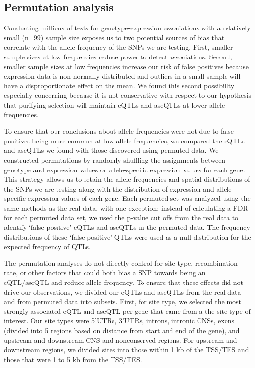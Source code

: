 \subsection{Permutation analysis}
Conducting millions of tests for genotype-expression associations with a relatively small (n=99) sample size exposes us to two potential sources of bias that correlate with the allele frequency of the SNPs we are testing. First, smaller sample sizes at low frequencies reduce power to detect associations. Second, smaller sample sizes at low frequencies increase our risk of false positives because expression data is non-normally distributed and outliers in a small sample will have a disproportionate effect on the mean. We found this second possibility especially concerning because it is not conservative with respect to our hypothesis that purifying selection will maintain eQTLs and aseQTLs at lower allele frequencies. 

To ensure that our conclusions about allele frequencies were not due to false positives being more common at low allele frequencies, we compared the eQTLs and aseQTLs we found with those discovered using permuted data. We constructed permutations by randomly shuffling the assignments between genotype and expression values or allele-specific expression values for each gene. This strategy allows us to retain the allele frequencies and spatial distributions of the SNPs we are testing along with the distribution of expression and allele-specific expression values of each gene. Each permuted set was analyzed using the same methods as the real data, with one exception: instead of calculating a FDR for each permuted data set, we used the p-value cut offs from the real data to identify ‘false-positive’ eQTLs and aseQTLs in the permuted data. The frequency distributions of these ‘false-positive’ QTLs were used as a null distribution for the expected frequency of QTLs.

The permutation analyses do not directly control for site type, recombination rate, or other factors that could both bias a SNP towards being an eQTL/aseQTL and reduce allele frequency. To ensure that these effects did not drive our observations, we divided our eQTLs and aseQTLs from the real data and from permuted data into subsets. First, for site type, we selected the most strongly associated eQTL and aseQTL per gene that came from a the site-type of interest. Our site types were 5’UTRs, 3’UTRs, introns, intronic CNSs, exons (divided into 5 regions based on distance from start and end of the gene), and upstream and downstream CNS and nonconserved regions. For upstream and downstream regions, we divided sites into those within 1 kb of the TSS/TES and those that were 1 to 5 kb from the TSS/TES. 

